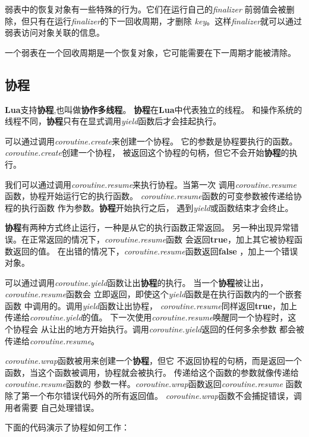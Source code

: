 \documentclass{ctexart}
\begin{document}
弱表中的恢复对象有一些特殊的行为。它们在运行自己的\emph{finalizer}
前弱值会被删除，但只有在运行\emph{finalizer}的下一回收周期，才删除
\emph{key}。这样\emph{finalizer}就可以通过弱表访问对象关联的信息。

一个弱表在一个回收周期是一个恢复对象，它可能需要在下一周期才能被清除。

\subsection{协程}

\textbf{Lua}支持\textbf{协程},也叫做\textbf{协作多线程}。
\textbf{协程}在\textbf{Lua}中代表独立的线程。
和操作系统的线程不同，\textbf{协程}只有在显式调用\emph{yield}函数后才会挂起执行。

可以通过调用\emph{coroutine.create}来创建一个协程。
它的参数是协程要执行的函数。\emph{coroutine.create}创建一个协程，
被返回这个协程的句柄，但它不会\textbf{}开始\textbf{协程}的执行。

我们可以通过调用\emph{coroutine.resume}来执行协程。当第一次
调用\emph{coroutine.resume}函数，协程开始运行它的执行函数。
\emph{coroutine.resume}函数的可变参数被传递给协程的执行函数
作为参数。\textbf{协程}开始执行之后，
遇到\emph{yield}或函数结束才会终止。

\textbf{协程}有两种方式终止运行，一种是从它的执行函数正常返回。
另一种出现异常错误。在正常返回的情况下，\emph{coroutine.resume}函数
会返回\textbf{true}，加上其它被协程函数返回的值。
在出错的情况下，\emph{coroutine.resume}函数返回\textbf{false}
，加上一个错误对象。

可以通过调用\emph{coroutine.yield}函数让出\textbf{协程}的执行。
当一个\textbf{协程}被让出，\emph{coroutine.resume}函数会
立即返回，即使这个\emph{yield}函数是在执行函数内的一个嵌套函数
中调用的。调用\emph{yield}函数让出协程，
\emph{coroutine.resume}同样返回\textbf{true}，加上
传递给\emph{coroutine.yield}的值。
下一次使用\emph{coroutine.resume}唤醒同一个协程时，这个协程会
从让出的地方开始执行。调用\emph{coroutine.yield}返回的任何多余参数
都会被传递给\emph{coroutine.resume}。

\emph{coroutine.wrap}函数被用来创建一个\textbf{协程}，但它
不返回协程的句柄，而是返回一个函数，当这个函数被调用，协程就会被执行。
传递给这个函数的参数就像传递给\emph{coroutine.resume}函数的
参数一样。\emph{coroutine.wrap}函数返回\emph{coroutine.resume}
函数除了第一个布尔错误代码外的所有返回值。
\emph{coroutine.wrap}函数不会捕捉错误，调用者需要
自己处理错误。

下面的代码演示了协程如何工作：
\end{document}
